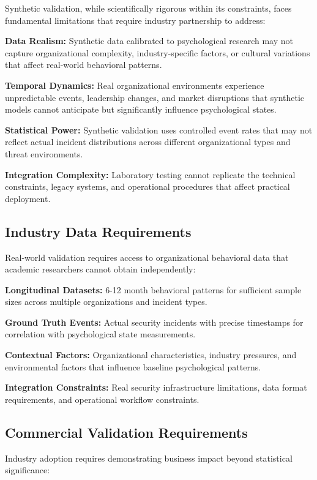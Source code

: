 \documentclass[10pt,twocolumn]{IEEEtran}
\begin{document}
Synthetic validation, while scientifically rigorous within its constraints, faces fundamental limitations that require industry partnership to address:

\textbf{Data Realism:} Synthetic data calibrated to psychological research may not capture organizational complexity, industry-specific factors, or cultural variations that affect real-world behavioral patterns.

\textbf{Temporal Dynamics:} Real organizational environments experience unpredictable events, leadership changes, and market disruptions that synthetic models cannot anticipate but significantly influence psychological states.

\textbf{Statistical Power:} Synthetic validation uses controlled event rates that may not reflect actual incident distributions across different organizational types and threat environments.

\textbf{Integration Complexity:} Laboratory testing cannot replicate the technical constraints, legacy systems, and operational procedures that affect practical deployment.

\subsection{Industry Data Requirements}

Real-world validation requires access to organizational behavioral data that academic researchers cannot obtain independently:

\textbf{Longitudinal Datasets:} 6-12 month behavioral patterns for sufficient sample sizes across multiple organizations and incident types.

\textbf{Ground Truth Events:} Actual security incidents with precise timestamps for correlation with psychological state measurements.

\textbf{Contextual Factors:} Organizational characteristics, industry pressures, and environmental factors that influence baseline psychological patterns.

\textbf{Integration Constraints:} Real security infrastructure limitations, data format requirements, and operational workflow constraints.

\subsection{Commercial Validation Requirements}

Industry adoption requires demonstrating business impact beyond statistical significance:
\end{document}
